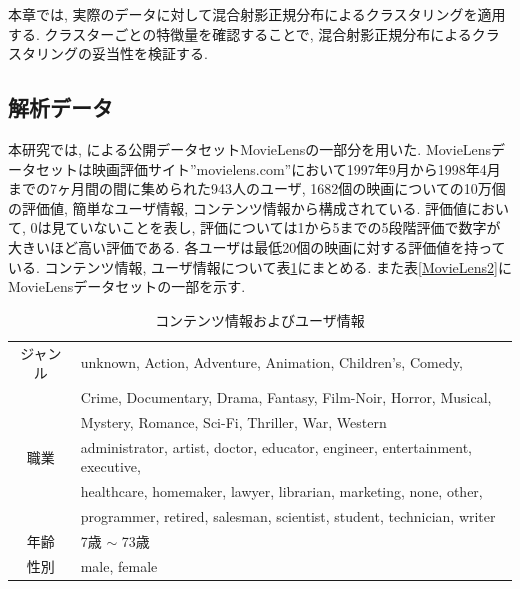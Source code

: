 \documentclass[a4j,12pt]{jarticle}
\begin{document}
本章では, 実際のデータに対して混合射影正規分布によるクラスタリングを適用する. クラスターごとの特徴量を確認することで, 混合射影正規分布によるクラスタリングの妥当性を検証する.

\subsection{解析データ}

本研究では, \citet{MovieLens}による公開データセットMovieLensの一部分を用いた. MovieLensデータセットは映画評価サイト''movielens.com''において1997年9月から1998年4月までの7ヶ月間の間に集められた943人のユーザ, 1682個の映画についての10万個の評価値, 簡単なユーザ情報, コンテンツ情報から構成されている. 評価値において, $0$は見ていないことを表し, 評価については1から5までの5段階評価で数字が大きいほど高い評価である. 各ユーザは最低20個の映画に対する評価値を持っている. コンテンツ情報, ユーザ情報について表\ref{MovieLens1}にまとめる. また表\ref{MovieLens2}にMovieLensデータセットの一部を示す.

\begin{table}[bp]
\begin{center}
\caption{コンテンツ情報およびユーザ情報}   %
\label{MovieLens1}   %
\begin{tabular}{c l}
\hline
ジャンル & unknown, Action, Adventure, Animation, Children's, Comedy, \\
                 & Crime, Documentary, Drama, Fantasy, Film-Noir, Horror, Musical, \\
                 & Mystery, Romance, Sci-Fi, Thriller, War, Western \\
職業          & administrator, artist, doctor, educator, engineer, entertainment, executive, \\
                & healthcare, homemaker, lawyer, librarian, marketing, none, other, \\
                & programmer, retired, salesman, scientist, student, technician, writer \\
年齢 & 7歳 $\sim$ 73歳 \\
性別 & male, female\\ 
\hline
\end{tabular}
\end{center}
\end{table}
\end{document}

